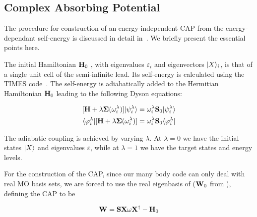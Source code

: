 
\subsection{Complex Absorbing Potential}
\label{subsec:CAP}

The procedure for construction of an energy-independent \ac{CAP} from the
energy-dependant self-energy is discussed in detail in~\cite{henderson}. We
briefly present the essential points here.

The initial Hamiltonian $\mathbf{H}_0$ , with eigenvalues $\varepsilon_i$ and
eigenvectors $|X \rangle_i$, is that of a single unit cell of the semi-infinite
lead. Its self-energy is calculated using the TIMES code~\cite{times}. The
self-energy is adiabatically added to the Hermitian Hamiltonian $\mathbf{H}_0$
leading to the following Dyson equations:

\begin{subequations}
\begin{align}
	[\mathbf{H} + \lambda \mathbf{\Sigma}(\omega_i^\lambda)] |\psi_i^\lambda \rangle
	&= \omega_i^\lambda \mathbf{S}_0 |\psi_i^\lambda \rangle \\
	\langle \varphi_i^\lambda| [\mathbf{H} + \lambda \mathbf{\Sigma}(\omega_i^\lambda)]
	&= \omega_i^\lambda \mathbf{S}_0 \langle \varphi_i^\lambda| 
	\label{eq:adiabaticap}
\end{align}
\end{subequations}

The adiabatic coupling is achieved by varying $\lambda$. At $\lambda = 0$ we
have the initial states $|X \rangle$ and eigenvalues $\varepsilon$, while at
$\lambda = 1$ we have the target states and energy levels.

For the construction of the \ac{CAP}, since our many body code can only deal
with real MO basis sets, we are forced to use the real eigenbasis of 
($\mathbf{W}_0$ from \cite{henderson}), defining the \ac{CAP} to be

\begin{equation}
	\mathbf{W} = \mathbf{S}\mathbf{X}\mathbf{\omega}\mathbf{X}^\dagger - \mathbf{H}_0
	\label{eq:capsdef}
\end{equation}

